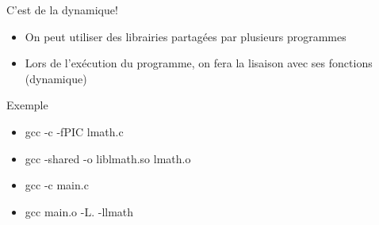 \begin{frame}[containsverbatim]{\ftitle}
\def\blocktitle{C'est de la dynamique!}
\begin{block}{\blocktitle}
\begin{itemize}
\item On peut utiliser des librairies partagées par plusieurs programmes
\item Lors de l'exécution du programme, on fera la lisaison avec ses fonctions (dynamique)
\end{itemize}
\end{block}
\def\blocktitle{Exemple}
\begin{block}{\blocktitle}
\begin{itemize}
\item gcc -c -fPIC lmath.c
\item gcc -shared -o liblmath.so lmath.o
\item gcc -c main.c
\item gcc main.o -L. -llmath
\end{itemize}
\end{block}
\end{frame}


